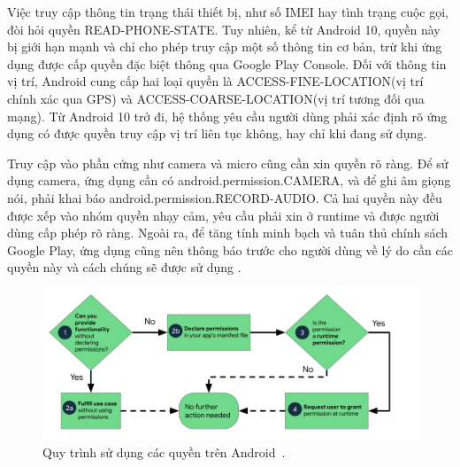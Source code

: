 \vspace{0.5em}

Việc truy cập thông tin trạng thái thiết bị, như số IMEI hay tình trạng cuộc gọi, đòi hỏi quyền READ-PHONE-STATE. Tuy nhiên, kể từ Android 10, quyền này bị giới hạn mạnh và chỉ cho phép truy cập một số thông tin cơ bản, trừ khi ứng dụng được cấp quyền đặc biệt thông qua Google Play Console. Đối với thông tin vị trí, Android cung cấp hai loại quyền là ACCESS-FINE-LOCATION(vị trí chính xác qua GPS) và ACCESS-COARSE-LOCATION(vị trí tương đối qua mạng). Từ Android 10 trở đi, hệ thống yêu cầu người dùng phải xác định rõ ứng dụng có được quyền truy cập vị trí liên tục không, hay chỉ khi đang sử dụng.

\vspace{0.5em}

Truy cập vào phần cứng như camera và micro cũng cần xin quyền rõ ràng. Để sử dụng camera, ứng dụng cần có android.permission.CAMERA, và để ghi âm giọng nói, phải khai báo android.permission.RECORD-AUDIO. Cả hai quyền này đều được xếp vào nhóm quyền nhạy cảm, yêu cầu phải xin ở runtime và được người dùng cấp phép rõ ràng. Ngoài ra, để tăng tính minh bạch và tuân thủ chính sách Google Play, ứng dụng cũng nên thông báo trước cho người dùng về lý do cần các quyền này và cách chúng sẽ được sử dụng \cite{permission}.
    
\begin{figure}[H] 
        \centering
            \includegraphics[width=1\textwidth]{images/permission.png}
            \caption{Quy trình sử dụng các quyền trên Android~\cite{runtime-permissions}.}
            \label{fig:android1}
\end{figure} 

